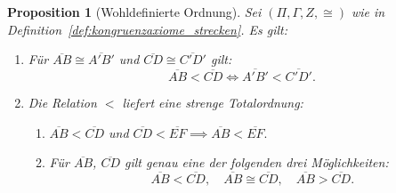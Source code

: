 \documentclass[a4paper,12pt]{article}
\theoremstyle{break}
\newtheorem{proposition}[definition]{Proposition}
\begin{document}
\begin{proposition}[Wohldefinierte Ordnung]
\label{prop:wohldefinierte_ordnung}
Sei \((\Pi, \Gamma, Z, \cong)\) wie in Definition~\ref{def:kongruenzaxiome_strecken}. Es gilt:
\begin{enumerate}
    \item Für \(\overline{AB} \cong \overline{A'B'}\) und \(\overline{CD} \cong \overline{C'D'}\) gilt:
    \[
    \overline{AB} < \overline{CD} \iff \overline{A'B'} < \overline{C'D'}.
    \]
    \item Die Relation \(<\) liefert eine strenge Totalordnung:
    \begin{enumerate}
        \item[\((2.1)\)] \(\overline{AB} < \overline{CD}\) und \(\overline{CD} < \overline{EF} \implies \overline{AB} < \overline{EF}.\)
        \item[\((2.2)\)] Für \(\overline{AB}\), \(\overline{CD}\) gilt genau eine der folgenden drei Möglichkeiten:
        \[
        \overline{AB} < \overline{CD}, \quad \overline{AB} \cong \overline{CD}, \quad \overline{AB} > \overline{CD}.
        \]
    \end{enumerate}
\end{enumerate}
\end{proposition}
\end{document}
